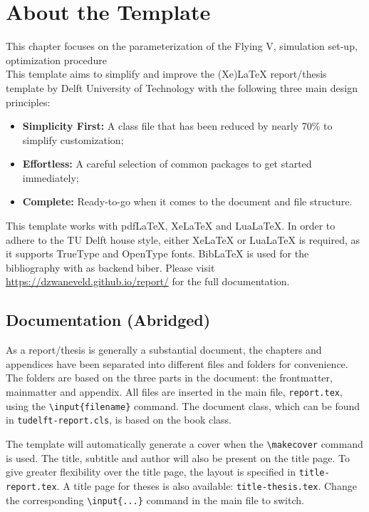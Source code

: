 \chapter{About the Template}
This chapter focuses on the parameterization of the Flying V, simulation set-up, optimization procedure \\
This template aims to simplify and improve the (Xe)LaTeX report/thesis template by Delft University of Technology with the following three main design principles:

\begin{itemize}
  \item \textbf{Simplicity First:} A class file that has been reduced by nearly 70\% to simplify customization;
  \item \textbf{Effortless:} A careful selection of common packages to get started immediately;
  \item \textbf{Complete:} Ready-to-go when it comes to the document and file structure.
\end{itemize}

\noindent This template works with pdfLaTeX, XeLaTeX and LuaLaTeX. In order to adhere to the TU Delft house style, either XeLaTeX or LuaLaTeX is required, as it supports TrueType and OpenType fonts. BibLaTeX is used for the bibliography with as backend biber. Please visit \url{https://dzwaneveld.github.io/report/} for the full documentation.

\section*{Documentation (Abridged)}

As a report/thesis is generally a substantial document, the chapters and appendices have been separated into different files and folders for convenience. The folders are based on the three parts in the document: the frontmatter, mainmatter and appendix. All files are inserted in the main file, \texttt{report.tex}, using the \texttt{\textbackslash input\{filename\}} command. The document class, which can be found in \texttt{tudelft-report.cls}, is based on the book class. 

The template will automatically generate a cover when the \texttt{\textbackslash makecover} command is used. The title, subtitle and author will also be present on the title page. To give greater flexibility over the title page, the layout is specified in \texttt{title-report.tex}. A title page for theses is also available: \texttt{title-thesis.tex}. Change the corresponding \texttt{\textbackslash input\{...\}} command in the main file to switch. 

